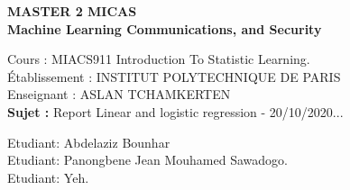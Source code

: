 \documentclass[12pt,onecolumn]{article}
\begin{document}
 
	\begin{center}
		\textbf{MASTER 2 MICAS \\[1.5cm]
		Machine Learning Communications, and Security}
		\\[1.8cm]
	\end{center}
    \begin{center}
    	Cours : MIACS911 Introduction To Statistic Learning.\\[1.5cm]
    	Établissement : INSTITUT POLYTECHNIQUE DE PARIS\\[1.5cm]
    	Enseignant : ASLAN TCHAMKERTEN\\[1.3cm]
    	\textbf{Sujet :} Report Linear and logistic regression - 20/10/2020...\\[1cm]
    \end{center}
  	\vspace{1.0cm}
	\begin{flushleft}
			Etudiant: Abdelaziz Bounhar\\
			Etudiant: Panongbene Jean Mouhamed Sawadogo.\\
			Etudiant: Yeh.\\
	\end{flushleft}
\thispagestyle{empty}
\setcounter{page}{0}
\newpage
\begin{flushleft}
\end{flushleft}
\normalsize

\newpage
\end{document}
